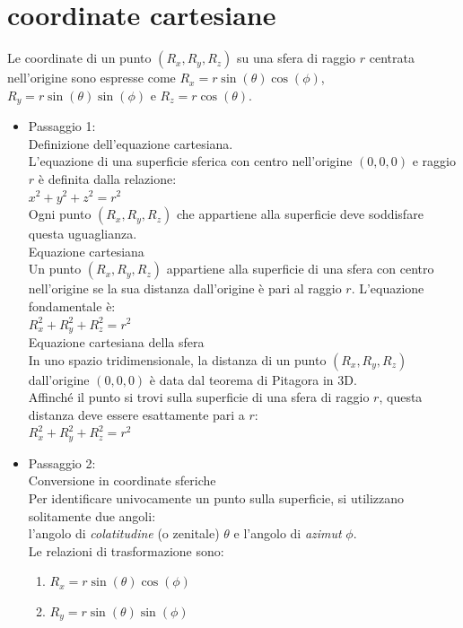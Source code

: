 \documentclass[a4paper,14pt]{article}
\begin{document}
\section{coordinate cartesiane}
Le coordinate di un punto \((R_{x},R_{y},R_{z})\) su una sfera di raggio \(r\) centrata nell'origine sono espresse come \(R_{x}=r\sin (\theta )\cos (\phi )\), \(R_{y}=r\sin (\theta )\sin (\phi )\) e \(R_{z}=r\cos (\theta )\).
\begin{itemize}
\item Passaggio 1: \\
Definizione dell'equazione cartesiana.\\
L'equazione di una superficie sferica con centro nell'origine \((0,0,0)\) e raggio \(r\) è definita dalla relazione:\\
\(x^{2}+y^{2}+z^{2}=r^{2}\)\\
Ogni punto \((R_{x},R_{y},R_{z})\) che appartiene alla superficie deve soddisfare questa uguaglianza.\\
Equazione cartesiana\\
Un punto \((R_{x},R_{y},R_{z})\) appartiene alla superficie di una sfera con centro nell'origine se la sua distanza dall'origine è pari al raggio \(r\). L'equazione fondamentale è:\\
\(R_{x}^{2}+R_{y}^{2}+R_{z}^{2}=r^{2}\)\\
Equazione cartesiana della sfera\\
In uno spazio tridimensionale, la distanza di un punto \((R_{x},R_{y},R_{z})\) dall'origine \((0,0,0)\) è data dal teorema di Pitagora in 3D.\\
Affinché il punto si trovi sulla superficie di una sfera di raggio \(r\), questa distanza deve essere esattamente pari a \(r\):\\
\(R_{x}^{2}+R_{y}^{2}+R_{z}^{2}=r^{2}\)
\item Passaggio 2:\\
Conversione in coordinate sferiche\\
Per identificare univocamente un punto sulla superficie, si utilizzano solitamente due angoli:\\
l'angolo di \emph{colatitudine} (o zenitale) \(\theta \) e l'angolo di \emph{azimut} \(\phi \).\\
Le relazioni di trasformazione sono:\\
\begin{enumerate}
\item \(R_{x}=r\sin (\theta )\cos (\phi )\)
\item \(R_{y}=r\sin (\theta )\sin (\phi )\)

\end{enumerate}
\end{itemize}
\end{document}
